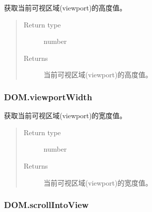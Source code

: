 \documentclass[letterpaper,10pt,english]{sphinxmanual}
\begin{document}
\begin{fulllineitems}
\label{api/core/dom/viewportHeight:DOM.viewportHeight}
获取当前可视区域(viewport)的高度值。
\begin{quote}\begin{description}
\item[{Return type}] \leavevmode
number

\item[{Returns}] \leavevmode
当前可视区域(viewport)的高度值。

\end{description}\end{quote}

\end{fulllineitems}



\subsubsection{DOM.viewportWidth}
\label{api/core/dom/viewportWidth:dom-viewportwidth}\label{api/core/dom/viewportWidth::doc}

\begin{fulllineitems}
\label{api/core/dom/viewportWidth:DOM.viewportWidth}
获取当前可视区域(viewport)的宽度值。
\begin{quote}\begin{description}
\item[{Return type}] \leavevmode
number

\item[{Returns}] \leavevmode
当前可视区域(viewport)的宽度值。

\end{description}\end{quote}

\end{fulllineitems}



\subsubsection{DOM.scrollIntoView}
\label{api/core/dom/scrollIntoView::doc}\label{api/core/dom/scrollIntoView:dom-scrollintoview}
\end{document}
